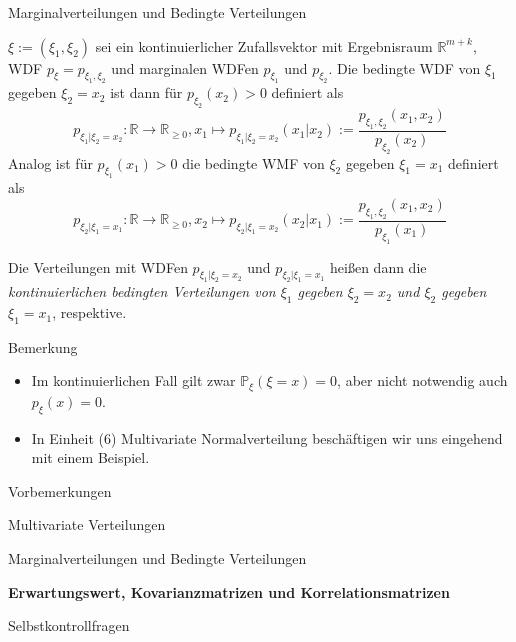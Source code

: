 \documentclass[
  8pt,
  ignorenonframetext,
]{beamer}
\providecommand{\tightlist}{%
  \setlength{\itemsep}{0pt}\setlength{\parskip}{0pt}}
\begin{document}
\begin{frame}{Marginalverteilungen und Bedingte Verteilungen}
\protect\hypertarget{marginalverteilungen-und-bedingte-verteilungen-6}{}
\footnotesize
\begin{definition}
\justifying
$\xi:= (\xi_1,\xi_2)$ sei ein kontinuierlicher Zufallsvektor mit Ergebnisraum
$\mathbb{R}^{m+k}$, WDF $p_\xi = p_{\xi_1,\xi_2}$ und marginalen WDFen $p_{\xi_1}$ und $p_{\xi_2}$.
Die bedingte WDF von $\xi_1$ gegeben $\xi_2 = x_2$ ist dann für $p_{\xi_2}(x_2) > 0$ definiert als
\begin{equation}
p_{\xi_1|\xi_2 = x_2} : \mathbb{R} \to \mathbb{R}_{\ge 0},
x_1 \mapsto p_{\xi_1|\xi_2 = x_2}(x_1|x_2) := \frac{p_{\xi_1,\xi_2}(x_1,x_2)}{p_{\xi_2}(x_2)}
\end{equation}
Analog ist für $p_{\xi_1}(x_1) > 0$ die bedingte WMF von $\xi_2$ gegeben $\xi_1 = x_1$ definiert als
\begin{equation}
p_{\xi_2|\xi_1 = x_1} : \mathbb{R} \to \mathbb{R}_{\ge 0},
x_2 \mapsto p_{\xi_2|\xi_1 = x_2}(x_2|x_1) := \frac{p_{\xi_1,\xi_2}(x_1,x_2)}{p_{\xi_1}(x_1)}
\end{equation}

Die Verteilungen mit WDFen $p_{\xi_1|\xi_2 = x_2}$ und $p_{\xi_2|\xi_1 = x_1}$ heißen dann
die \textit{kontinuierlichen bedingten Verteilungen von $\xi_1$ gegeben $\xi_2 = x_2$
und $\xi_2$ gegeben $\xi_1 = x_1$}, respektive.
\end{definition}

Bemerkung

\begin{itemize}
\tightlist
\item
  Im kontinuierlichen Fall gilt zwar \(\mathbb{P}_\xi(\xi = x) = 0\),
  aber nicht notwendig auch \(p_\xi(x) = 0\).
\item
  In Einheit (6) Multivariate Normalverteilung beschäftigen wir uns
  eingehend mit einem Beispiel.
\end{itemize}
\end{frame}

\begin{frame}{}
\protect\hypertarget{section-6}{}
\large
{}
\vfill

Vorbemerkungen

Multivariate Verteilungen

Marginalverteilungen und Bedingte Verteilungen

\textbf{Erwartungswert, Kovarianzmatrizen und Korrelationsmatrizen}

Selbstkontrollfragen \vfill
\end{frame}
\end{document}
